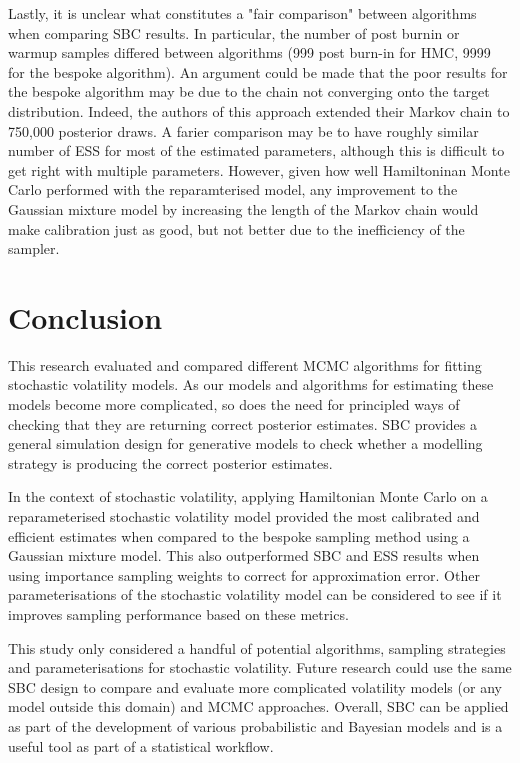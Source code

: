 \documentclass[12pt, a4paper]{article}
\begin{document}
Lastly, it is unclear what constitutes a "fair comparison" between algorithms when comparing SBC results. In particular, the number of post burnin or warmup samples differed between algorithms (999 post burn-in for HMC, 9999 for the bespoke algorithm). An argument could be made that the poor results for the bespoke algorithm may be due to the chain not converging onto the target distribution. Indeed, the authors of this approach extended their Markov chain to 750,000 posterior draws. A farier comparison may be to have roughly similar number of ESS for most of the estimated parameters, although this is difficult to get right with multiple parameters. However, given how well Hamiltoninan Monte Carlo performed with the reparamterised model, any improvement to the Gaussian mixture model by increasing the length of the Markov chain would make calibration just as good, but not better due to the inefficiency of the sampler. 

\section{Conclusion}
This research evaluated and compared different MCMC algorithms for fitting stochastic volatility models. As our models and algorithms for estimating these models become more complicated, so does the need for principled ways of checking that they are returning correct posterior estimates. SBC provides a general simulation design for generative models to check whether a modelling strategy is producing the correct posterior estimates. 

In the context of stochastic volatility, applying Hamiltonian Monte Carlo on a reparameterised stochastic volatility model provided the most calibrated and efficient estimates when compared to the bespoke sampling method using a Gaussian mixture model. This also outperformed SBC and ESS results when using importance sampling weights to correct for approximation error. Other parameterisations of the stochastic volatility model can be considered to see if it improves sampling performance based on these metrics. 

This study only considered a handful of potential algorithms, sampling strategies and parameterisations for stochastic volatility. Future research could use the same SBC design to compare and evaluate more complicated volatility models (or any model outside this domain) and MCMC approaches. Overall, SBC can be applied as part of the development of various probabilistic and Bayesian models and is a useful tool as part of a statistical workflow.
 
\end{document}
